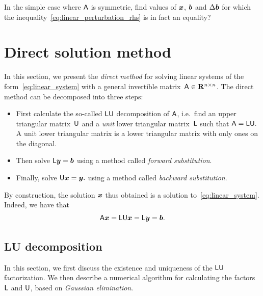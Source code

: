 \begin{exercise}
    \label{exercise:linear_sharp_inequality}
    In the simple case where $\mathsf A$ is symmetric,
    find values of $\mathbf{\boldsymbol{x}}$, $\mathbf{\boldsymbol{b}}$ and $\Delta \mathbf{\boldsymbol{b}}$ for which the inequality~\eqref{eq:linear_perturbation_rhs} is in fact an equality?
\end{exercise}

\section{Direct solution method}%
\label{sec:direct_solution_method}
In this section,
we present the \emph{direct method} for solving linear systems of the form~\eqref{eq:linear_system}
with a general invertible matrix~$\mathsf A \in \mathbf R^{n \times n}$.
The direct method can be decomposed into three steps:
\begin{itemize}
    \item
        First calculate the so-called $\mathsf L \mathsf U$ decomposition of $\mathsf A$,
        i.e.\ find an upper triangular matrix~$\mathsf U$ and a \emph{unit} lower triangular matrix~$\mathsf L$ such that
        \(
            \mathsf A = \mathsf L \mathsf U.
        \)
        A unit lower triangular matrix is a lower triangular matrix with only ones on the diagonal.

    \item
        Then solve
        \(
            \mathsf L \mathbf{\boldsymbol{y}} = \mathbf{\boldsymbol{b}}
        \)
         using a method called \emph{forward substitution}.

    \item
        Finally, solve
        \(
            \mathsf U \mathbf{\boldsymbol{x}} = \mathbf{\boldsymbol{y}}.
        \)
         using a method called \emph{backward substitution}.
\end{itemize}
By construction, the solution $\mathbf{\boldsymbol{x}}$ thus obtained is a solution to~\eqref{eq:linear_system}.
Indeed, we have that
\[
    \mathsf A \mathbf{\boldsymbol{x}} = \mathsf L \mathsf U \mathbf{\boldsymbol{x}} = \mathsf L \mathbf{\boldsymbol{y}} = \mathbf{\boldsymbol{b}}.
\]

\subsection{LU decomposition}%
\label{sub:lu_decomposition}

In this section,
we first discuss the existence and uniqueness of the $\mathsf L \mathsf U$ factorization.
We then describe a numerical algorithm for calculating the factors $\mathsf L$ and $\mathsf U$,
based on \emph{Gaussian elimination}.

